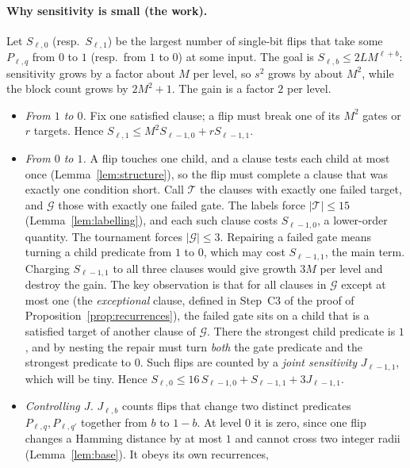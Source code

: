 \documentclass[11pt]{article}
\theoremstyle{definition}
\theoremstyle{remark}
\begin{document}
\paragraph{Why sensitivity is small (the work).}
Let \(S_{\ell,0}\) (resp.\ \(S_{\ell,1}\)) be the largest number of single-bit
flips that take some \(P_{\ell,q}\) from \(0\) to \(1\) (resp.\ from \(1\) to
\(0\)) at some input. The goal is \(S_{\ell,b}\le 2LM^{\ell+b}\): sensitivity
grows by a factor about \(M\) per level, so \(s^2\) grows by about \(M^2\),
while the block count grows by \(2M^2+1\). The gain is a factor \(2\) per
level.
\begin{itemize}[leftmargin=1.5em]
\item \emph{From \(1\) to \(0\).} Fix one satisfied clause; a flip must break
 one of its \(M^2\) gates or \(r\) targets. Hence
 \(S_{\ell,1}\le M^2S_{\ell-1,0}+rS_{\ell-1,1}\).
\item \emph{From \(0\) to \(1\).} A flip touches one child, and a clause
 tests each child at most once (Lemma~\ref{lem:structure}), so the flip must
 complete a clause that was exactly one condition short. Call
 \(\mathcal T\) the clauses with exactly one failed target, and
 \(\mathcal G\) those with exactly one failed gate. The labels force
 \(|\mathcal T|\le 15\) (Lemma~\ref{lem:labelling}), and each such clause
 costs \(S_{\ell-1,0}\), a lower-order quantity. The tournament forces
 \(|\mathcal G|\le3\). Repairing a failed gate means turning a child
 predicate from \(1\) to \(0\), which may cost \(S_{\ell-1,1}\), the main
 term. Charging \(S_{\ell-1,1}\) to all three clauses would give growth
 \(3M\) per level and destroy the gain. The key observation is that for all
 clauses in \(\mathcal G\) except at most one (the \emph{exceptional}
 clause, defined in Step~C3 of the proof of
 Proposition~\ref{prop:recurrences}), the failed gate sits on a child that
 is a satisfied target of another clause of \(\mathcal G\). There the
 strongest child predicate is \(1\), and by nesting the repair must turn
 \emph{both} the gate predicate and the strongest predicate to \(0\). Such
 flips are counted by a \emph{joint sensitivity} \(J_{\ell-1,1}\), which will
 be tiny. Hence
 \(S_{\ell,0}\le 16\,S_{\ell-1,0}+S_{\ell-1,1}+3J_{\ell-1,1}\).
\item \emph{Controlling \(J\).} \(J_{\ell,b}\) counts flips that change two
 distinct predicates \(P_{\ell,q},P_{\ell,q'}\) together from \(b\) to
 \(1-b\). At level \(0\) it is zero, since one flip changes a Hamming
 distance by at most \(1\) and cannot cross two integer radii
 (Lemma~\ref{lem:base}). It obeys its own recurrences,

\end{itemize}
\end{document}
